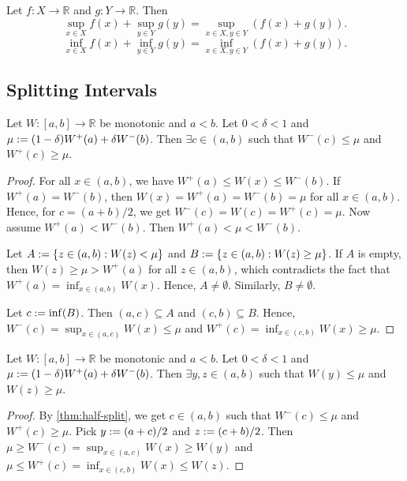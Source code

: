 \documentclass[a4paper,12pt,fleqn]{article}
\begin{document}
\begin{lemma}
\label{thm:sum-of-sup-inf-2}
Let $f: X \to \mathbb{R}$ and $g: Y \to \mathbb{R}$. Then
\[ \sup_{x \in X} f(x) + \sup_{y \in Y} g(y)
= \sup_{x \in X, y \in Y} (f(x) + g(y)). \]
\[ \inf_{x \in X} f(x) + \inf_{y \in Y} g(y)
= \inf_{x \in X, y \in Y} (f(x) + g(y)). \]
\end{lemma}

\subsection{Splitting Intervals}

\begin{lemma}
\label{thm:half-split}
Let $W: [a, b] \to \mathbb{R}$ be monotonic and $a < b$.
Let $0 < \delta < 1$ and $\mu := (1-\delta) W^+(a) + \delta W^-(b)$.
Then $\exists c \in (a, b)$ such that $W^-(c) \le \mu$ and $W^+(c) \ge \mu$.
\end{lemma}
\begin{proof}
For all $x \in (a, b)$, we have $W^+(a) \le W(x) \le W^-(b)$.
If $W^+(a) = W^-(b)$, then $W(x) = W^+(a) = W^-(b) = \mu$ for all $x \in (a, b)$.
Hence, for $c = (a+b)/2$, we get $W^-(c) = W(c) = W^+(c) = \mu$.
Now assume $W^+(a) < W^-(b)$. Then $W^+(a) < \mu < W^-(b)$.

Let $A := \{z \in (a, b): W(z) < \mu\}$
and $B := \{z \in (a, b): W(z) \ge \mu\}$.
If $A$ is empty, then $W(z) \ge \mu > W^+(a)$ for all $z \in (a, b)$,
which contradicts the fact that $W^+(a) = \inf_{x \in (a, b)} W(x)$.
Hence, $A \neq \emptyset$. Similarly, $B \neq \emptyset$.

Let $c := \inf(B)$. Then $(a, c) \subseteq A$ and $(c, b) \subseteq B$.
Hence, $W^-(c) = \sup_{x \in (a, c)} W(x) \le \mu$
and $W^+(c) = \inf_{x \in (c, b)} W(x) \ge \mu$.
\end{proof}

\begin{lemma}
\label{thm:half-split-2}
Let $W: [a, b] \to \mathbb{R}$ be monotonic and $a < b$.
Let $0 < \delta < 1$ and $\mu := (1-\delta) W^+(a) + \delta W^-(b)$.
Then $\exists y, z \in (a, b)$ such that $W(y) \le \mu$ and $W(z) \ge \mu$.
\end{lemma}
\begin{proof}
By \cref{thm:half-split}, we get $c \in (a, b)$ such that
$W^-(c) \le \mu$ and $W^+(c) \ge \mu$.
Pick $y := (a+c)/2$ and $z := (c+b)/2$.
Then $\mu \ge W^-(c) = \sup_{x \in (a, c)} W(x) \ge W(y)$
and $\mu \le W^+(c) = \inf_{x \in (c, b)} W(x) \le W(z)$.
\end{proof}
\end{document}
